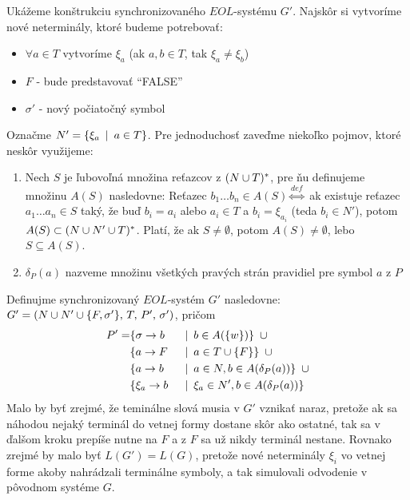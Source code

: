 \begin{dokaz}
  Ukážeme konštrukciu synchronizovaného $EOL$-systému $G'$. Najskôr
  si vytvoríme nové neterminály, ktoré budeme potrebovať:
  \begin{itemize}
    \item $\forall a \in T$ vytvoríme $\xi_a$ (ak $a,b\in T$, tak
        $\xi_a \not= \xi_b$)
    \item $F$ - bude predstavovať ``FALSE''
    \item $\sigma'$ - nový počiatočný symbol
  \end{itemize}
  Označme $N' = \{\xi_a \enspace |\enspace a\in T\}$. Pre jednoduchosť zaveďme
  niekoľko pojmov, ktoré neskôr využijeme:
  \begin{enumerate}
    \item Nech $S$ je ľubovoľná množina reťazcov z $(N \cup T)^*$, pre
      ňu definujeme množinu $A(S)$ nasledovne:
      Reťazec $b_1 \dots b_n \in A(S) \overset{def}\iff$
      ak existuje reťazec $a_1 \dots a_n \in S$
      taký, že buď $b_i = a_i$ alebo $a_i \in T$ a $b_i = \xi_{a_i}$
      (teda $b_i\in N'$), potom $A(S) \subset (N \cup N' \cup
      T)^*$.
      Platí, že ak $S \not= \emptyset$, potom $A(S)\neq\emptyset$,
      lebo $S\subseteq A(S)$.
    \item $\delta_P(a)$ nazveme množinu všetkých pravých strán
      pravidiel pre symbol $a$ z $P$
  \end{enumerate}
  Definujme synchronizovaný $EOL$-systém $G'$ nasledovne:
  $G' = (N\cup N'\cup\{F,\sigma'\},\,T,\,P',\,\sigma')$, pričom
  \begin{alignat*}{2}
    P'=  &\{\sigma \rightarrow b
            &&\enspace |\enspace b \in A(\{w\})\} \enspace  \cup\\ 
         &\{a \rightarrow F
            &&\enspace |\enspace a\in T\cup \{F\}\} \enspace \cup \\
         &\{a \rightarrow b
            &&\enspace |\enspace a\in N, b \in A(\delta_P(a))\} \enspace \cup \\
         &\{\xi_a \rightarrow b
            &&\enspace |\enspace \xi_a\in N', b \in A(\delta_P(a))\}
  \end{alignat*}
  Malo by byť zrejmé, že teminálne slová musia v $G'$ vznikať naraz,
  pretože ak sa náhodou nejaký terminál do vetnej formy dostane skôr
  ako ostatné, tak sa v ďalšom kroku prepíše nutne na $F$ a z $F$ sa
  už nikdy terminál nestane. Rovnako zrejmé by malo byť
  $L(G')=L(G)$, pretože nové neterminály $\xi_i$ vo vetnej forme
  akoby nahrádzali terminálne symboly, a tak simulovali odvodenie v
  pôvodnom systéme $G$.
\end{dokaz}


